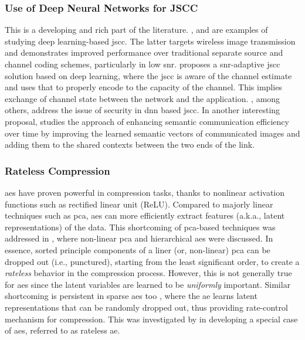 \subsubsection{Use of Deep Neural Networks for JSCC}

This is a developing and rich part of the literature. \cite{xie21_deep_learn_enabl_seman_commun_system}, \cite{jankowski21_wirel_image_retriev_edge} and
\cite{bourtsoulatze19_deep_joint_sourc_chann_codin} are  examples of studying deep learning-based  \gls{jscc}. The latter targets wireless image transmission and demonstrates improved performance over traditional separate source and channel coding schemes, particularly in low  \gls{snr}. \cite{xu2023deep} proposes a \gls{snr}-adaptive \gls{jscc} solution based on deep learning, where the \gls{jscc} is aware of the channel estimate and uses that to properly encode to the capacity of the channel. This implies exchange of channel state between the network and the application. \cite{kalkhoran23_secur_deep_jscc_again_multip_eaves}, among others,  address the issue of security in \gls{dnn} based \gls{jscc}. In another interesting proposal, \cite{tang2024evolving} studies the approach of enhancing semantic communication  efficiency over time by improving the learned semantic vectors of communicated images and adding them to the shared contexts between the two ends of the link.

\subsubsection{Rateless Compression}

\glspl{ae} have proven powerful in compression tasks, thanks to  nonlinear activation functions such as rectified linear unit (ReLU). Compared to majorly linear techniques such as \gls{pca}, \glspl{ae} can more efficiently extract   features (a.k.a., latent representations) of  the data. This shortcoming of \gls{pca}-based techniques was addressed in \cite{scholz2008nonlinear}, where  non-linear \gls{pca} and hierarchical \glspl{ae} were discussed. In essence, sorted principle components of a liner (or, non-linear) \gls{pca} can be dropped out (i.e., punctured), starting from the least significant order, to create a \emph{rateless} behavior in the compression process. However, this is not generally true for \glspl{ae} since the latent
variables are  learned to be \emph{uniformly} important. Similar shortcoming is persistent  in sparse \glspl{ae} too \cite{ng2011sparse}, where the \gls{ae} learns  latent representations  that can be randomly dropped out, thus providing  rate-control mechanism for compression. This was investigated by \cite{koikeakino2020stochasticbottleneckratelessautoencoder} in developing a special case of \glspl{ae}, referred to as rateless \gls{ae}. 

